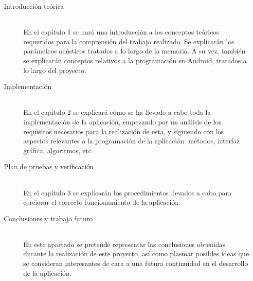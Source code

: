 
\begin{description}

\item[Introducción teórica]\hfill \\
En el capítulo 1 se hará una introducción a los conceptos teóricos requeridos para la comprensión del trabajo realizado.
Se explicarán los parámetros acústicos tratados a lo largo de la memoria.
A su vez, también se explicarán conceptos relativos a la programación en Android, tratados a lo largo del proyecto.

\item[Implementación]\hfill \\
En el capítulo 2 se explicará cómo se ha llevado a cabo toda la implementación de la aplicación, empezando por un análisis de los requisitos necesarios para la realización de esta, y siguiendo con los aspectos relevantes a la programación de la aplicación: métodos, interfaz gráfica, algoritmos, etc.

\filbreak
\item[Plan de pruebas y verificación] \hfill \\
En el capítulo 3 se explicarán los procedimientos llevados a cabo para cerciorar el correcto funcionamiento de la aplicación.

\item[Conclusiones y trabajo futuro] \hfill \\
En este apartado se pretende representar las conclusiones obtenidas durante la realización de este proyecto, así como plasmar posibles ideas que se consideran interesantes de cara a una futura continuidad en el desarrollo de la aplicación.

\end{description}

\chapterend